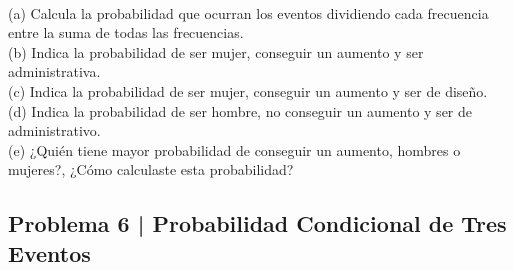 \documentclass{article}
\begin{document}
\\[12pt]
(a) Calcula la probabilidad que ocurran los eventos dividiendo cada frecuencia entre la suma de todas las frecuencias.
\\[6pt]
(b) Indica la probabilidad de ser mujer, conseguir un aumento y ser administrativa.
\\[6pt]
(c) Indica la probabilidad de ser mujer, conseguir un aumento y ser de diseño.
\\[6pt]
(d) Indica la probabilidad de ser hombre, no conseguir un aumento y ser de administrativo.
\\[6pt]
(e) ¿Quién tiene mayor probabilidad de conseguir un aumento, hombres o mujeres?, ¿Cómo calculaste esta probabilidad?

\clearpage

\subsection*{Problema 6 | Probabilidad Condicional de Tres Eventos}
\end{document}
